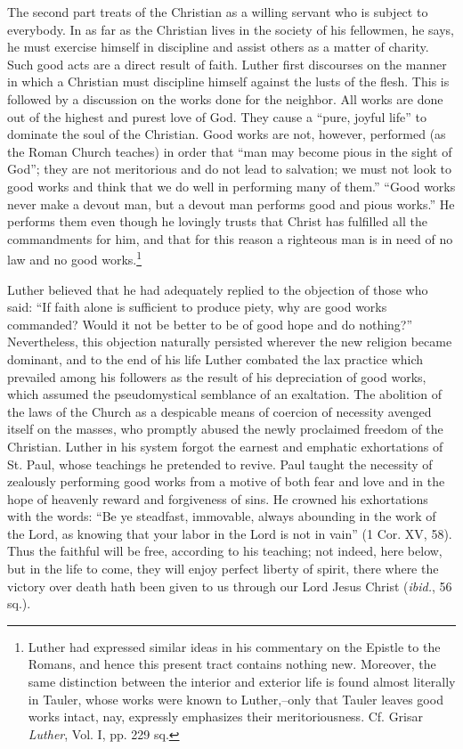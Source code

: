 The second part treats of the Christian as a willing servant who is subject
to everybody. In as far as the Christian lives in the society of his fellowmen,
he says, he must exercise himself in discipline and assist others as a
matter of charity. Such good acts are a direct result of faith. Luther first
discourses on the manner in which a Christian must discipline himself against
the lusts of the flesh. This is followed by a discussion on the works
done for the neighbor. All works are done out of the highest and purest
love of God. They cause a “pure, joyful life” to dominate the soul of the
Christian. Good works are not, however, performed (as the Roman Church
teaches) in order that “man may become pious in the sight of God”; they
are not meritorious and do not lead to salvation; we must not look to good
works and think that we do well in performing many of them.” “Good
works never make a devout man, but a devout man performs good and
pious works.” He performs them even though he lovingly trusts that Christ
has fulfilled all the commandments for him, and that for this reason a
righteous man is in need of no law and no good works.\footnote
{Luther had expressed similar ideas in his commentary on the Epistle to the Romans,
and hence this present tract contains nothing new. Moreover, the same distinction between
the interior and exterior life is found almost literally in Tauler, whose works were known
to Luther,--only that Tauler leaves good works intact, nay, expressly emphasizes their
meritoriousness. Cf. Grisar \textit{Luther}, Vol. I, pp. 229 sq.}

Luther believed that he had adequately replied to the objection of
those who said: “If faith alone is sufficient to produce piety, why are
good works commanded? Would it not be better to be of good hope
and do nothing?” Nevertheless, this objection naturally persisted
wherever the new religion became dominant, and to the end of his
life Luther combated the lax practice which prevailed among his followers
as the result of his depreciation of good works, which assumed
the pseudomystical semblance of an exaltation. The abolition of the
laws of the Church as a despicable means of coercion of necessity
avenged itself on the masses, who promptly abused the newly proclaimed
freedom of the Christian. Luther in his system forgot the
earnest and emphatic exhortations of St. Paul, whose teachings he
pretended to revive. Paul taught the necessity of zealously performing
good works from a motive of both fear and love and in the hope
of heavenly reward and forgiveness of sins. He crowned his exhortations
with the words: “Be ye steadfast, immovable, always abounding in the work
of the Lord, as knowing that your labor in the Lord
is not in vain” (1 Cor. XV, 58). Thus the faithful will be free, according
to his teaching; not indeed, here below, but in the life to
come, they will enjoy perfect liberty of spirit, there where the victory
over death hath been given to us through our Lord Jesus Christ
(\textit{ibid.}, 56 sq.).

